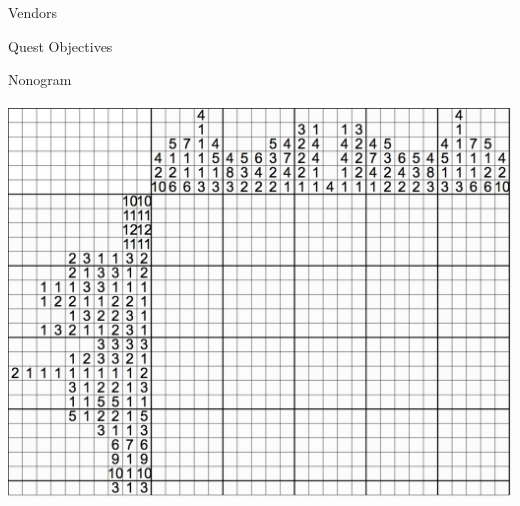 \documentclass[a4paper,12pt]{article}
\newcommand{\articleAuthor}{}
\newenvironment{article}[2]{
	\pagebreak[2]
	\renewcommand{\articleAuthor}{#2}
	
	{\Huge#1}

	}{

	\notblank{\articleAuthor}{\hfill\Large\articleAuthor}{}
	\vspace{12mm}
	}
\begin{document}
\clearpage

\begin{article}{Vendors}{}
	
\end{article}

\clearpage
\begin{article}{Quest Objectives}{}
	
\end{article}

\begin{article}{Nonogram}{}
	\begin{center}
	\includegraphics[width=\textwidth,height=0.5\textheight,keepaspectratio]{puzzles/nonogram.jpg}
	\end{center}
\end{article}

\pagebreak
\end{document}
